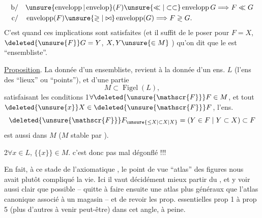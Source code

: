 \[
\begin{aligned}
\text{b/}\quad &\unsure{\operatorname{envelopp}|\operatorname{envelop}}(F)\unsure{\ll|\subset\subset}\operatorname{envelopp}G\Longrightarrow F\ll G\\
\text{c/}\quad &\operatorname{envelopp}(F)\unsure{\gtrless|\bowtie}\operatorname{envelopp}(G)\Longrightarrow F\gtrless G.
\end{aligned}
\]
C'est quand ces  implications sont satisfaites  (et il suffit de le poser pour $F=X$, $\deleted{\unsure{F}}G=Y$, $X,Y\unsure{\in M}$ ) qu'on dit que le  est ``ensembliste''.


\uline{Proposition}. La donnée d'un  ensembliste,  revient à la donnée d'un ens. $L$ (l'ens des ``lieux'' ou ``points''), et d'une partie
\[
M\subset\operatorname{Figel}(L),
\]
satisfaisant les conditions
\uline{} 1\quad $\forall\deleted{\unsure{\mathscr{F}}}F\in M$, et tout $\deleted{\unsure{x}}X\in\deleted{\unsure{\mathscr{F}}}F$, l'ens.
\[
\deleted{\unsure{\mathscr{F}}}F_{\unsure{\leq X|\subset X|X}}=(Y\in F\mid Y\subset X)\subset F
\]
est aussi dans $M$ ($M$ stable par ).

\uline{} 2\quad $\forall x\in L$, $\{\{x\}\}\in M$.
 c'est donc pas mal dégonflé !!!

En fait, à ce stade de l'axiomatique , le point de vue ``atlas'' des figures nous avait plutôt compliqué la vie. Ici il vaut décidément mieux partir du , et y voir aussi clair que possible -- quitte à faire ensuite une    atlas plus
généraux que l'atlas canonique associé à un magasin -- et de revoir les prop. essentielles prop 1 à prop 5 (plus d'autres à venir peut-être) dans cet angle,   à peine.

